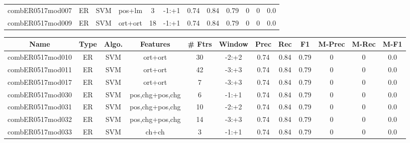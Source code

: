 \documentclass[a4paper]{article}
\begin{document}
\begin{landscape}
\begin{center}
\begin{tabular}{ |c|c|c|c|c|c|c|c|c|c|c|c|}
 	\small{ combER0517mod007 } & ER & SVM & pos+lm  &  3 &  -1:+1  &  0.74 & 0.84 & 0.79  &  0 & 0 & 0.0 \\
 	

 
 	
 	\small{ combER0517mod009 } & ER & SVM & ort+ort  &  18 &  -1:+1  &  0.74 & 0.84 & 0.79  &  0 & 0 & 0.0 \\
 	
 \hline
\end{tabular}
\end{center}




\begin{center}
\begin{tabular}{ |c|c|c|c|c|c|c|c|c|c|c|c|} 
 \hline
 	Name & Type & Algo. & Features & \# Ftrs & Window & Prec & Rec & F1 & M-Prec & M-Rec & M-F1\\
 \hline

 	

 
 	
 	\small{ combER0517mod010 } & ER & SVM & ort+ort  &  30 &  -2:+2  &  0.74 & 0.84 & 0.79  &  0 & 0 & 0.0 \\
 	

 
 	
 	\small{ combER0517mod011 } & ER & SVM & ort+ort  &  42 &  -3:+3  &  0.74 & 0.84 & 0.79  &  0 & 0 & 0.0 \\
 	

 
 	
 	\small{ combER0517mod017 } & ER & SVM & ort+ort  &  7 &  -3:+3  &  0.74 & 0.84 & 0.79  &  0 & 0 & 0.0 \\
 	

 
 	
 	\small{ combER0517mod030 } & ER & SVM & pos,chg+pos,chg  &  6 &  -1:+1  &  0.74 & 0.84 & 0.79  &  0 & 0 & 0.0 \\
 	

 
 	
 	\small{ combER0517mod031 } & ER & SVM & pos,chg+pos,chg  &  10 &  -2:+2  &  0.74 & 0.84 & 0.79  &  0 & 0 & 0.0 \\
 	

 
 	
 	\small{ combER0517mod032 } & ER & SVM & pos,chg+pos,chg  &  14 &  -3:+3  &  0.74 & 0.84 & 0.79  &  0 & 0 & 0.0 \\
 	

 
 	
 	\small{ combER0517mod033 } & ER & SVM & ch+ch  &  3 &  -1:+1  &  0.74 & 0.84 & 0.79  &  0 & 0 & 0.0 \\
 	


\end{tabular}
\end{center}
\end{landscape}
\end{document}
